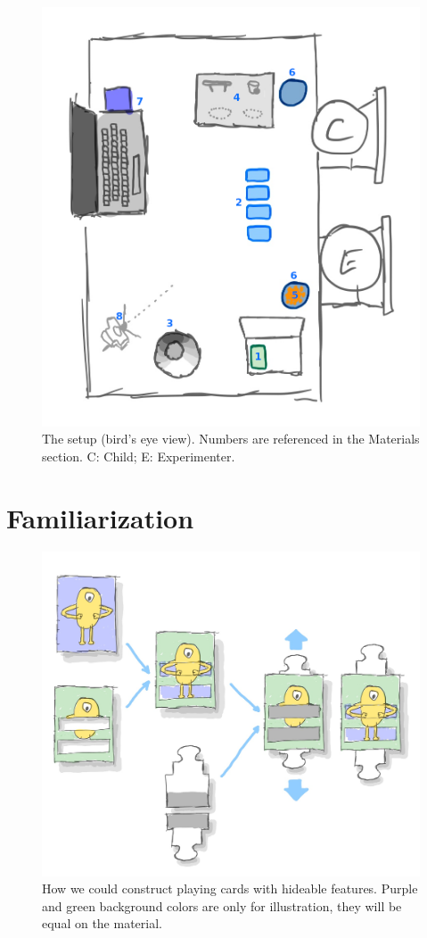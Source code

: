 \documentclass{article}
\begin{document}
\begin{figure}
\centering
\includegraphics[width=.5\textwidth]{images/setup.png}
\caption{ The setup (bird's eye view). Numbers are referenced in the Materials section. C: Child; E: Experimenter. }
\label{fig:setup}
\end{figure}



\section{Familiarization}\label{familiarization}

\begin{figure}
\centering
\includegraphics[width=.8\textwidth]{images/card_construction.png}
\caption{ How we could construct playing cards with hideable features. Purple and green background colors are only for illustration, they will be equal on the material. }
\label{fig:cards}
\end{figure}
\end{document}
